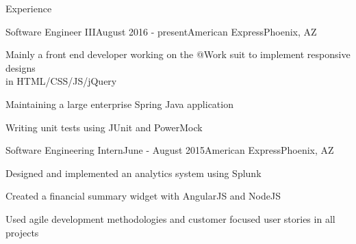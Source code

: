 \documentclass{resume} %
\begin{document}
\begin{rSection}{Experience}

\begin{rSubsection}{Software Engineer III}{August 2016 - present}{American Express}{Phoenix, AZ}
\item Mainly a front end developer working on the @Work suit to implement responsive designs\\in HTML/CSS/JS/jQuery
\item Maintaining a large enterprise Spring Java application
\item Writing unit tests using JUnit and PowerMock

\end{rSubsection}
\begin{rSubsection}{Software Engineering Intern}{June - August 2015}{American Express}{Phoenix, AZ}
\item Designed and implemented an analytics system using Splunk 
\item Created a financial summary widget with AngularJS and NodeJS
\item Used agile development methodologies and customer focused user stories in all projects
\end{rSubsection}






\end{rSection}
\end{document}
